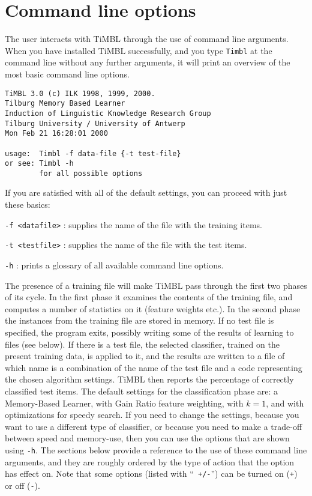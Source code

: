 \documentclass{report}
\begin{document}
\chapter{Command line options}
\label{commandline}

The user interacts with TiMBL through the use of command line arguments.
When you have installed TiMBL successfully, and you type {\tt Timbl} at the
command line without any further arguments, it will print an overview
of the most basic command line options. 

\begin{verbatim}
TiMBL 3.0 (c) ILK 1998, 1999, 2000.
Tilburg Memory Based Learner
Induction of Linguistic Knowledge Research Group
Tilburg University / University of Antwerp
Mon Feb 21 16:28:01 2000

usage:  Timbl -f data-file {-t test-file}
or see: Timbl -h
        for all possible options
\end{verbatim}

If you are satisfied with all of the default settings, you can proceed
with just these basics:

\begin{description}

\item {\tt -f <datafile>} : supplies the name of the file with the training items.
\item {\tt -t <testfile>} : supplies the name of the file with the 
test items.
\item {\tt -h} : prints a glossary of all available command line 
options.

\end{description}

The presence of a training file will make TiMBL pass through the first
two phases of its cycle. In the first phase it examines the contents
of the training file, and computes a number of statistics on it
(feature weights etc.). In the second phase the instances from the
training file are stored in memory. If no test file is specified, the
program exits, possibly writing some of the results of learning to
files (see below). If there is a test file, the selected classifier,
trained on the present training data, is applied to it, and the
results are written to a file of which name is a combination of the
name of the test file and a code representing the chosen algorithm
settings. TiMBL then reports the percentage of correctly classified
test items. The default settings for the classification phase are: a
Memory-Based Learner, with Gain Ratio feature weighting, with $k=1$,
and with optimizations for speedy search. If you need to change the
settings, because you want to use a different type of classifier, or
because you need to make a trade-off between speed and memory-use,
then you can use the options that are shown using {\tt -h}. The
sections below provide a reference to the use of these command line
arguments, and they are roughly ordered by the type of action that the
option has effect on. Note that some options (listed with ``{\tt
+/-}'') can be turned on ({\tt +}) or off ({\tt -}).
\end{document}
